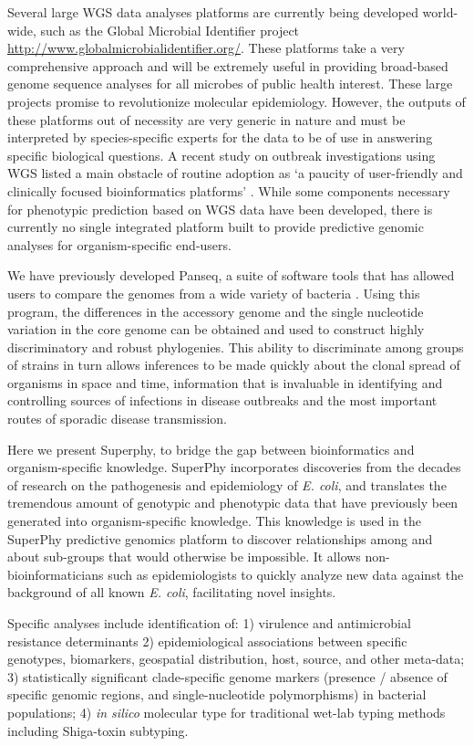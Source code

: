 \documentclass{bmcart}
\begin{document}
Several large WGS data analyses platforms are currently being developed world-wide, such as the Global Microbial Identifier project \url{http://www.globalmicrobialidentifier.org/}. These platforms take a very comprehensive approach and will be extremely useful in providing broad-based genome sequence analyses for all microbes of public health interest. These large projects promise to revolutionize molecular epidemiology. However, the outputs of these platforms out of necessity are very generic in nature and must be interpreted by species-specific experts for the data to be of use in answering specific biological questions. A recent study on outbreak investigations using WGS listed a main obstacle of routine adoption as `a paucity of user-friendly and clinically focused bioinformatics platforms'  \cite{sherry_outbreak_2013}. While some components necessary for phenotypic prediction based on WGS data have been developed, there is currently no single integrated platform built to provide predictive genomic analyses for organism-specific end-users.

We have previously developed Panseq, a suite of software tools that has allowed users to compare the genomes from a wide variety of bacteria \cite{laing_pan-genome_2010}. Using this program, the differences in the accessory genome and the single nucleotide variation in the core genome can be obtained and used to construct highly discriminatory and robust phylogenies. This ability to discriminate among groups of strains in turn allows inferences to be made quickly about the clonal spread of organisms in space and time, information that is invaluable in identifying and controlling sources of infections in disease outbreaks and the most important routes of sporadic disease transmission. 

Here we present Superphy, to bridge the gap between bioinformatics and organism-specific knowledge. SuperPhy incorporates discoveries from the decades of research on the pathogenesis and epidemiology of \textit{E. coli}, and translates the tremendous amount of genotypic and phenotypic data that have previously been generated into organism-specific knowledge. This knowledge is used in the SuperPhy predictive genomics platform to discover relationships among and about sub-groups that would otherwise be impossible. It allows non-bioinformaticians such as epidemiologists to quickly analyze new data against the background of all known \textit{E. coli}, facilitating novel insights.

Specific analyses include identification of: 1) virulence and antimicrobial resistance determinants 2) epidemiological associations between specific genotypes, biomarkers, geospatial distribution, host, source, and other meta-data; 3) statistically significant clade-specific genome markers (presence / absence of specific genomic regions, and single-nucleotide polymorphisms) in bacterial populations; 4) \textit{in silico} molecular type for traditional wet-lab typing methods including Shiga-toxin subtyping.
\end{document}
